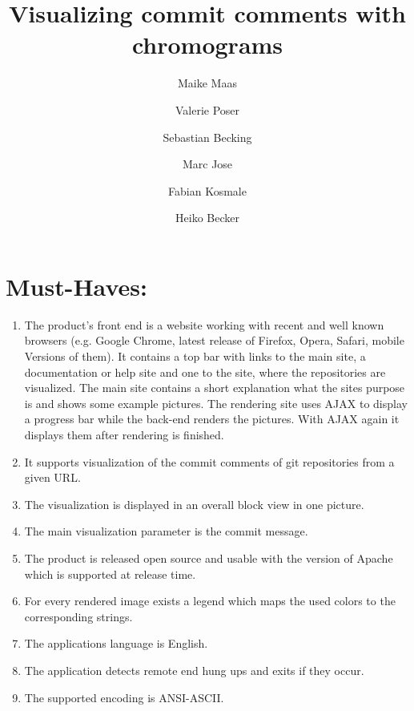 \documentclass[12pt]{scrartcl}
\author{Maike Maas \and Valerie Poser \and Sebastian Becking
\and Marc Jose \and Fabian Kosmale  \and Heiko Becker}
\title{Visualizing commit comments with chromograms}
\begin{document}
\maketitle
\section{Must-Haves:}
\begin{enumerate}
\item The product's front end is a website working with recent and well known browsers (e.g. Google Chrome, latest release of Firefox, Opera, Safari, mobile Versions of them). It contains a top bar with links to the main site, a documentation or help site and one to the site, where the repositories are visualized. The main site contains a short explanation what the sites purpose is and shows some example pictures. The rendering site uses AJAX to display a progress bar while the back-end renders the pictures. With AJAX again it displays them after rendering is finished.
\item It supports visualization of the commit comments of git repositories from a given URL. 
\item The visualization is displayed in an overall block view in one picture.
\item The main visualization parameter is the commit message.
\item The product is released open source and usable with the version of Apache which is supported at release time.
\item For every rendered image exists a legend which maps the used colors to the corresponding strings.
\item The applications language is English.
\item The application detects remote end hung ups and exits if they occur.
\item The supported encoding is ANSI-ASCII.
\end{enumerate}
\end{document}
